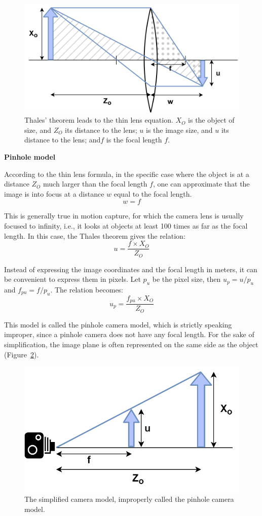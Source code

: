 \begin{figure}[hbtp]
	\centering
	\def\svgwidth{\columnwidth}
	\fontsize{10pt}{10pt}\selectfont
	\includegraphics[width=0.5\linewidth]{"../Chap2/Figures/Thin_Lens.png"}
	\caption{Thales' theorem leads to the thin lens equation. \(X_O\) is the object of size, and \(Z_O\) its distance to the lens; \(u\) is the image size, and \(u\) its distance to the lens; and\(f\) is the focal length \(f\).} 
	\label{fig_thinlens}
\end{figure}

\noindent\textbf{Pinhole model}

According to the thin lens formula, in the specific case where the object is at a distance \(Z_O\) much larger than the focal length \(f\), one can approximate that the image is into focus at a distance \(w\) equal to the focal length. 
\begin{equation}
    w=f
\end{equation}

This is generally true in motion capture, for which the camera lens is usually focused to infinity, i.e., it looks at objects at least 100 times as far as the focal length. In this case, the Thales theorem gives the relation:
\begin{equation}
  u=\frac{f\times X_O}{Z_O}
\end{equation}

Instead of expressing the image coordinates and the focal length in meters, it can be convenient to express them in pixels. Let \(p_u\) be the pixel size, then \(u_p = u/p_u\) and \(f_{pu} = f/p_u\). The relation becomes:
\begin{equation}
  u_p=\frac{f_{pu}\times X_O}{Z_O}
\end{equation}

This model is called the pinhole camera model, which is strictly speaking improper, since a pinhole camera does not have any focal length. For the sake of simplification, the image plane is often represented on the same side as the object (Figure~\ref{fig_cameralens}). 

\begin{figure}[hbtp]
	\centering
	\def\svgwidth{\columnwidth}
	\fontsize{10pt}{10pt}\selectfont
	\includegraphics[width=0.5\linewidth]{"../Chap2/Figures/Camera_Lens.png"}
	\caption{The simplified camera model, improperly called the pinhole camera model.} 
	\label{fig_cameralens}
\end{figure}


